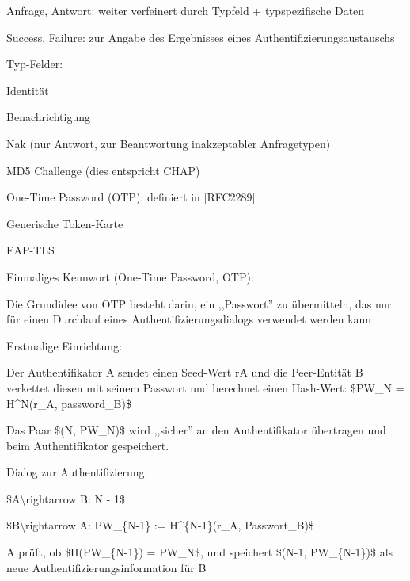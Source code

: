 \documentclass[a4paper]{article}
\begin{document}
\begin{multicols}{3}
\begin{itemize*}
\begin{itemize*}
                  \begin{itemize*} \item Anfrage, Antwort: weiter verfeinert durch Typfeld + typspezifische Daten \item Success, Failure: zur Angabe des Ergebnisses eines Authentifizierungsaustauschs \end{itemize*}
                  \item Typ-Felder:
                  \begin{itemize*} \item Identität \item Benachrichtigung \item Nak (nur Antwort, zur Beantwortung inakzeptabler Anfragetypen) \item MD5 Challenge (dies entspricht CHAP) \item One-Time Password (OTP): definiert in {[}RFC2289{]} \item Generische Token-Karte \item EAP-TLS \end{itemize*}
            \end{itemize*}
            \item Einmaliges Kennwort (One-Time Password, OTP):
            \begin{itemize*}
                  \item Die Grundidee von OTP besteht darin, ein ,,Passwort'' zu übermitteln, das nur für einen Durchlauf eines Authentifizierungsdialogs verwendet werden kann
                  \item Erstmalige Einrichtung:
                  \begin{itemize*} \item Der Authentifikator A sendet einen Seed-Wert rA und die Peer-Entität B verkettet diesen mit seinem Passwort und berechnet einen Hash-Wert: \$PW\_N = H\^{}N(r\_A, password\_B)\$ \item Das Paar \$(N, PW\_N)\$ wird ,,sicher'' an den Authentifikator übertragen und beim Authentifikator gespeichert. \end{itemize*}
                  \item Dialog zur Authentifizierung:
                  \begin{itemize*} \item \$A\textbackslash rightarrow B: N - 1\$ \item \$B\textbackslash rightarrow A: PW\_\{N-1\} := H\^{}\{N-1\}(r\_A, Passwort\_B)\$ \item A prüft, ob \$H(PW\_\{N-1\}) = PW\_N\$, und speichert \$(N-1, PW\_\{N-1\})\$ als neue Authentifizierungsinformation für B \end{itemize*}

\end{itemize*}
\end{itemize*}
\end{multicols}
\end{document}
